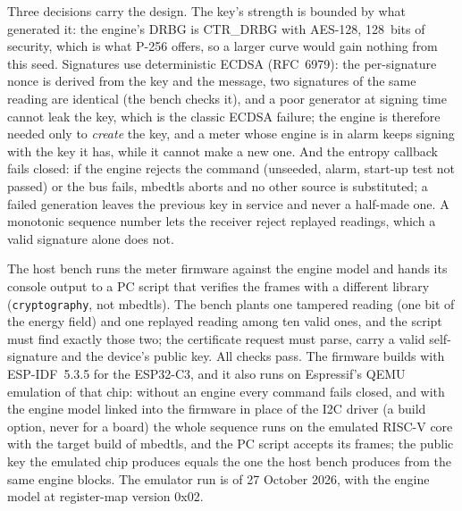 Three decisions carry the design. The key's strength is bounded by what
generated it: the engine's \ac{DRBG} is CTR\_DRBG with AES-128, 128~bits
of security, which is what P-256 offers, so a larger curve would gain
nothing from this seed. Signatures use deterministic ECDSA
(RFC~6979): the per-signature nonce is derived from the key and the
message, two signatures of the same reading are identical (the bench
checks it), and a poor generator at signing time cannot leak the key,
which is the classic ECDSA failure; the engine is therefore needed only
to \emph{create} the key, and a meter whose engine is in alarm keeps
signing with the key it has, while it cannot make a new one. And the
entropy callback fails closed: if the engine rejects the command
(unseeded, alarm, start-up test not passed) or the bus fails, mbedtls
aborts and no other source is substituted; a failed generation leaves the
previous key in service and never a half-made one. A monotonic sequence
number lets the receiver reject replayed readings, which a valid
signature alone does not.

The host bench runs the meter firmware against the engine model and
hands its console output to a PC script that verifies the frames with a
different library (\texttt{cryptography}, not mbedtls). The bench plants
one tampered reading (one bit of the energy field) and one replayed
reading among ten valid ones, and the script must find exactly those
two; the certificate request must parse, carry a valid self-signature and
the device's public key. All checks pass. The firmware builds with
ESP-IDF~5.3.5 for the ESP32-C3, and it also runs on Espressif's QEMU
emulation of that chip: without an engine every command fails closed, and
with the engine model linked into the firmware in place of the \ac{I2C}
driver (a build option, never for a board) the whole sequence runs on the
emulated RISC-V core with the target build of mbedtls, and the PC script
accepts its frames; the public key the emulated chip produces equals the
one the host bench produces from the same engine blocks. The emulator
run is of 27 October 2026, with the engine model at register-map
version 0x02.

